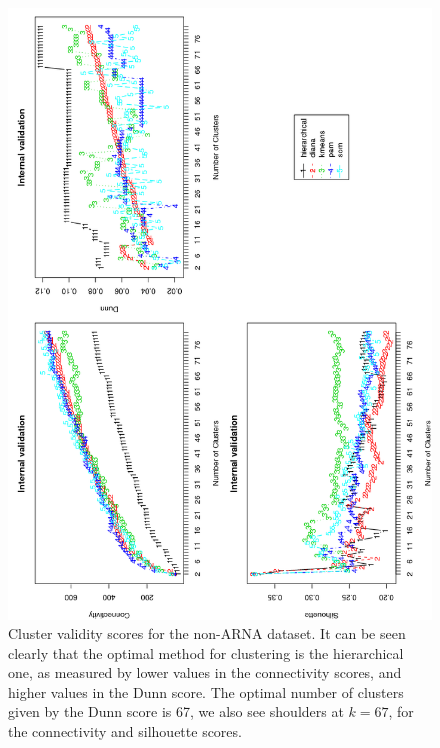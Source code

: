 \begin{figure}
 \centering
\includegraphics[angle=0, scale=0.72]{Chapter2/noarna_val.png}
\caption{Cluster validity  scores for the non-ARNA dataset.  It can be
  seen  clearly  that  the   optimal  method  for  clustering  is  the
  hierarchical one,  as measured by  lower values in  the connectivity
  scores, and higher  values in the Dunn score.  The optimal number of
  clusters given  by the Dunn  score is 67,  we also see  shoulders at
  $k=67$, for the connectivity and silhouette scores.}
 \label{fig:noarna}
\end{figure}

